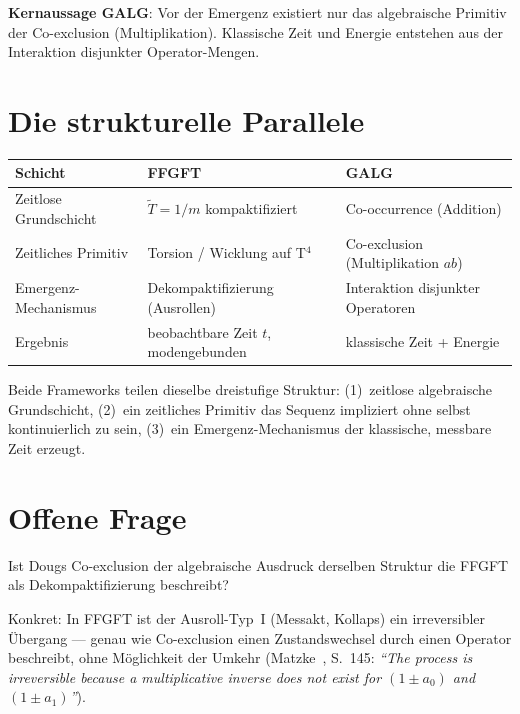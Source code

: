 \textbf{Kernaussage GALG}:
Vor der Emergenz existiert nur das algebraische Primitiv
der Co-exclusion (Multiplikation).
Klassische Zeit und Energie entstehen aus der Interaktion
disjunkter Operator-Mengen.

\section{Die strukturelle Parallele}

\begin{center}
\begin{tabular}{lll}
\toprule
\textbf{Schicht} & \textbf{FFGFT} & \textbf{GALG} \\
\midrule
Zeitlose Grundschicht
  & $\tilde{T}=1/m$ kompaktifiziert
  & Co-occurrence (Addition) \\
Zeitliches Primitiv
  & Torsion / Wicklung auf T$^4$
  & Co-exclusion (Multiplikation $ab$) \\
Emergenz-Mechanismus
  & Dekompaktifizierung (Ausrollen)
  & Interaktion disjunkter Operatoren \\
Ergebnis
  & beobachtbare Zeit $t$, modengebunden
  & klassische Zeit + Energie \\
\bottomrule
\end{tabular}
\end{center}

Beide Frameworks teilen dieselbe dreistufige Struktur:
(1)~zeitlose algebraische Grundschicht,
(2)~ein zeitliches Primitiv das Sequenz impliziert ohne selbst
kontinuierlich zu sein,
(3)~ein Emergenz-Mechanismus der klassische, messbare Zeit erzeugt.

\section{Offene Frage}

Ist Dougs Co-exclusion der algebraische Ausdruck
derselben Struktur die FFGFT als Dekompaktifizierung beschreibt?

Konkret: In FFGFT ist der Ausroll-Typ~I (Messakt, Kollaps) ein
irreversibler Übergang --- genau wie Co-exclusion einen
Zustandswechsel durch einen Operator beschreibt, ohne Möglichkeit
der Umkehr (Matzke~\cite{Matzke2002}, S.~145:
\textit{``The process is irreversible because a multiplicative
inverse does not exist for $(1\pm a_0)$ and $(1\pm a_1)$''}).


